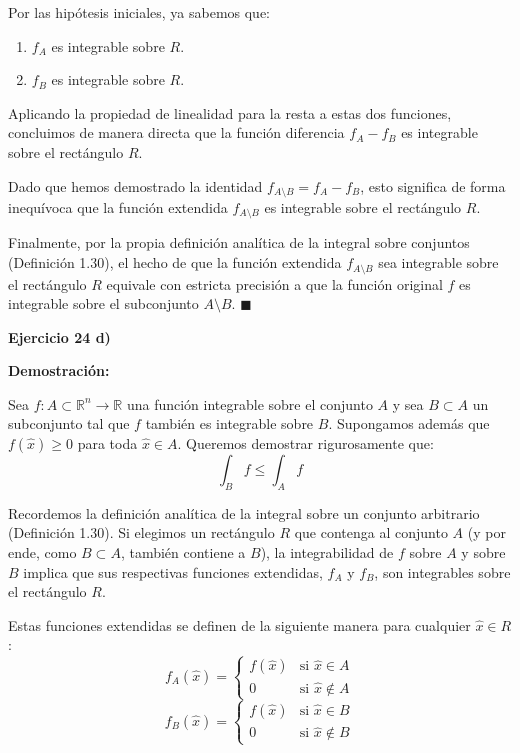 \documentclass[11pt,letterpaper]{article}
\begin{document}
Por las hipótesis iniciales, ya sabemos que:
\begin{enumerate}
    \item $f_A$ es integrable sobre $R$.
    \item $f_B$ es integrable sobre $R$.
\end{enumerate}

Aplicando la propiedad de linealidad para la resta a estas dos funciones, concluimos de manera directa que la función diferencia $f_A - f_B$ es integrable sobre el rectángulo $R$.

Dado que hemos demostrado la identidad $f_{A \setminus B} = f_A - f_B$, esto significa de forma inequívoca que la función extendida $f_{A \setminus B}$ es integrable sobre el rectángulo $R$.

Finalmente, por la propia definición analítica de la integral sobre conjuntos (Definición 1.30), el hecho de que la función extendida $f_{A \setminus B}$ sea integrable sobre el rectángulo $R$ equivale con estricta precisión a que la función original $f$ es integrable sobre el subconjunto $A \setminus B$. \hfill $\blacksquare$

\textbf{Ejercicio 24 d)}

\textbf{Demostración:}

Sea $f: A \subset \mathbb{R}^n \rightarrow \mathbb{R}$ una función integrable sobre el conjunto $A$ y sea $B \subset A$ un subconjunto tal que $f$ también es integrable sobre $B$. Supongamos además que $f(\hat{x}) \ge 0$ para toda $\hat{x} \in A$. Queremos demostrar rigurosamente que:
\begin{equation*}
\int_B f \le \int_A f
\end{equation*}

Recordemos la definición analítica de la integral sobre un conjunto arbitrario (Definición 1.30). Si elegimos un rectángulo $R$ que contenga al conjunto $A$ (y por ende, como $B \subset A$, también contiene a $B$), la integrabilidad de $f$ sobre $A$ y sobre $B$ implica que sus respectivas funciones extendidas, $f_A$ y $f_B$, son integrables sobre el rectángulo $R$. 

Estas funciones extendidas se definen de la siguiente manera para cualquier $\hat{x} \in R$:
\begin{equation*}
f_A(\hat{x}) = 
\begin{cases} 
f(\hat{x}) & \text{si } \hat{x} \in A \\ 
0 & \text{si } \hat{x} \notin A 
\end{cases}
\end{equation*}
\begin{equation*}
f_B(\hat{x}) = 
\begin{cases} 
f(\hat{x}) & \text{si } \hat{x} \in B \\ 
0 & \text{si } \hat{x} \notin B 
\end{cases}
\end{equation*}
\end{document}
